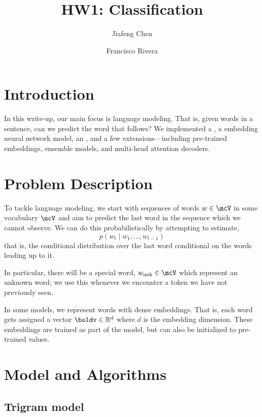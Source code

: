 \documentclass[12pt]{article}
\title{HW1: Classification}
\author{Jiafeng Chen \and
Francisco Rivera}
\begin{document}
\maketitle{}
\section{Introduction}
In this write-up, our main focus is language modeling. That is, given words in a
sentence, can we predict the word that follows? We implemented a
, a embedding neural network model, an
, and a few extensions---including pre-trained embeddings,
ensemble models, and multi-head attention decoders.

\section{Problem Description}


To tackle language modeling, we start with sequences of words $w \in \mcV$ in
some vocabulary $\mcV$ and aim to predict the last word in the sequence which we
cannot observe. We can do this probabilistically by attempting to estimate,
\begin{equation}
p(w_t \mid w_1, \ldots, w_{t-1})
\label{eq:probabilistic}
\end{equation}
that is, the conditional distribution over the last word conditional on the
words leading up to it.

In particular, there will be a special word, $w_\text{unk} \in \mcV$ which
represent an unknown word; we use this whenever we encounter a token we have not
previously seen.

In some models, we represent words with dense embeddings. That is, each word
gets assigned a vector $\boldv \in \mathbb{R}^d$ where $d$ is the embedding
dimension. These embeddings are trained as part of the model, but can also be
initialized to pre-trained values.

\section{Model and Algorithms}


\subsection{Trigram model}
\label{subsec:trigram}
\end{document}
